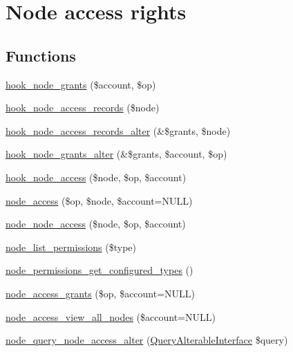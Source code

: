 \hypertarget{group__node__access}{
\section{Node access rights}
\label{group__node__access}
}
\subsection*{Functions}
\begin{DoxyCompactItemize}
\item 
\hyperlink{group__node__access_gaa973f2ab6ab14c3fa14e5138c6d69ecf}{hook\_\-node\_\-grants} (\$account, \$op)
\item 
\hyperlink{group__node__access_ga3fe7744d74446e40e9b9ad2a782b4269}{hook\_\-node\_\-access\_\-records} (\$node)
\item 
\hyperlink{group__node__access_ga37c90bf0e1dccad0deefa368dd94cc83}{hook\_\-node\_\-access\_\-records\_\-alter} (\&\$grants, \$node)
\item 
\hyperlink{group__node__access_ga21e95e2bd0b4ed12d861aa83426a8ba3}{hook\_\-node\_\-grants\_\-alter} (\&\$grants, \$account, \$op)
\item 
\hyperlink{group__node__access_ga75a280ea1fbe0fb6ca034f8aad06d58d}{hook\_\-node\_\-access} (\$node, \$op, \$account)
\item 
\hyperlink{group__node__access_ga46f0f1ed812befada8f8e7d1b8c352db}{node\_\-access} (\$op, \$node, \$account=NULL)
\item 
\hyperlink{group__node__access_gae826daeafed8b20300a370c2022cc2c1}{node\_\-node\_\-access} (\$node, \$op, \$account)
\item 
\hyperlink{group__node__access_ga929efd16564e3cb073ee5e1ed6c6c2a7}{node\_\-list\_\-permissions} (\$type)
\item 
\hyperlink{group__node__access_ga75960e1cc5852c75c6347ab938938f9b}{node\_\-permissions\_\-get\_\-configured\_\-types} ()
\item 
\hyperlink{group__node__access_gab33de8c23b1edb657f67cb242a8ec8af}{node\_\-access\_\-grants} (\$op, \$account=NULL)
\item 
\hyperlink{group__node__access_gafb79200147d5087ceb32cb6b0632afd4}{node\_\-access\_\-view\_\-all\_\-nodes} (\$account=NULL)
\item 
\hyperlink{group__node__access_gaef7c83544718b8431d81b884ef8cc6f5}{node\_\-query\_\-node\_\-access\_\-alter} (\hyperlink{interfaceQueryAlterableInterface}{QueryAlterableInterface} \$query)

\end{DoxyCompactItemize}
